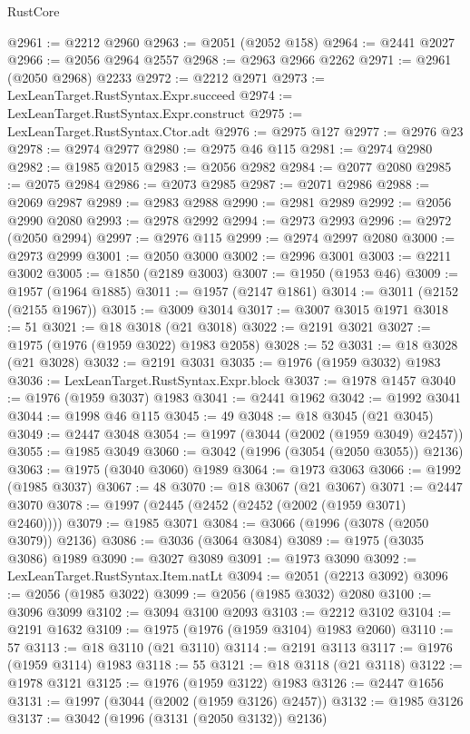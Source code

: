 \begin{lexlean}{RustCore}
\begin{coremodule}
@2961 := @2212 @2960
@2963 := @2051 (@2052 @158)
@2964 := @2441 @2027
@2966 := @2056 @2964 @2557
@2968 := @2963 @2966 @2262
@2971 := @2961 (@2050 @2968) @2233
@2972 := @2212 @2971
@2973 := LexLeanTarget.RustSyntax.Expr.succeed
@2974 := LexLeanTarget.RustSyntax.Expr.construct
@2975 := LexLeanTarget.RustSyntax.Ctor.adt
@2976 := @2975 @127
@2977 := @2976 @23
@2978 := @2974 @2977
@2980 := @2975 @46 @115
@2981 := @2974 @2980
@2982 := @1985 @2015
@2983 := @2056 @2982
@2984 := @2077 @2080
@2985 := @2075 @2984
@2986 := @2073 @2985
@2987 := @2071 @2986
@2988 := @2069 @2987
@2989 := @2983 @2988
@2990 := @2981 @2989
@2992 := @2056 @2990 @2080
@2993 := @2978 @2992
@2994 := @2973 @2993
@2996 := @2972 (@2050 @2994)
@2997 := @2976 @115
@2999 := @2974 @2997 @2080
@3000 := @2973 @2999
@3001 := @2050 @3000
@3002 := @2996 @3001
@3003 := @2211 @3002
@3005 := @1850 (@2189 @3003)
@3007 := @1950 (@1953 @46)
@3009 := @1957 (@1964 @1885)
@3011 := @1957 (@2147 @1861)
@3014 := @3011 (@2152 (@2155 @1967))
@3015 := @3009 @3014
@3017 := @3007 @3015 @1971
@3018 := 51
@3021 := @18 @3018 (@21 @3018)
@3022 := @2191 @3021
@3027 := @1975 (@1976 (@1959 @3022) @1983 @2058)
@3028 := 52
@3031 := @18 @3028 (@21 @3028)
@3032 := @2191 @3031
@3035 := @1976 (@1959 @3032) @1983
@3036 := LexLeanTarget.RustSyntax.Expr.block
@3037 := @1978 @1457
@3040 := @1976 (@1959 @3037) @1983
@3041 := @2441 @1962
@3042 := @1992 @3041
@3044 := @1998 @46 @115
@3045 := 49
@3048 := @18 @3045 (@21 @3045)
@3049 := @2447 @3048
@3054 := @1997 (@3044 (@2002 (@1959 @3049) @2457))
@3055 := @1985 @3049
@3060 := @3042 (@1996 (@3054 (@2050 @3055)) @2136)
@3063 := @1975 (@3040 @3060) @1989
@3064 := @1973 @3063
@3066 := @1992 (@1985 @3037)
@3067 := 48
@3070 := @18 @3067 (@21 @3067)
@3071 := @2447 @3070
@3078 := @1997 (@2445 (@2452 (@2452 (@2002 (@1959 @3071) @2460))))
@3079 := @1985 @3071
@3084 := @3066 (@1996 (@3078 (@2050 @3079)) @2136)
@3086 := @3036 (@3064 @3084)
@3089 := @1975 (@3035 @3086) @1989
@3090 := @3027 @3089
@3091 := @1973 @3090
@3092 := LexLeanTarget.RustSyntax.Item.natLt
@3094 := @2051 (@2213 @3092)
@3096 := @2056 (@1985 @3022)
@3099 := @2056 (@1985 @3032) @2080
@3100 := @3096 @3099
@3102 := @3094 @3100 @2093
@3103 := @2212 @3102
@3104 := @2191 @1632
@3109 := @1975 (@1976 (@1959 @3104) @1983 @2060)
@3110 := 57
@3113 := @18 @3110 (@21 @3110)
@3114 := @2191 @3113
@3117 := @1976 (@1959 @3114) @1983
@3118 := 55
@3121 := @18 @3118 (@21 @3118)
@3122 := @1978 @3121
@3125 := @1976 (@1959 @3122) @1983
@3126 := @2447 @1656
@3131 := @1997 (@3044 (@2002 (@1959 @3126) @2457))
@3132 := @1985 @3126
@3137 := @3042 (@1996 (@3131 (@2050 @3132)) @2136)

\end{coremodule}
\end{lexlean}
